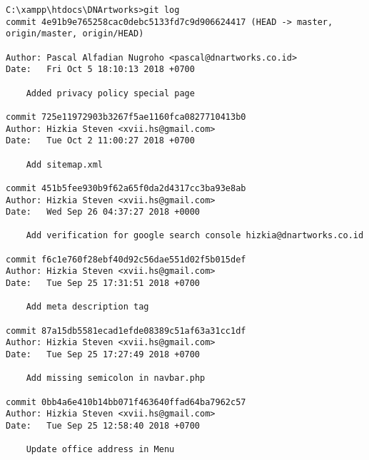 \begin{lstlisting}[caption={Histori \textit{commit} pada proyek DNArtworks},label={lst:commit_history_dnartworks},language=plaintext]
C:\xampp\htdocs\DNArtworks>git log
commit 4e91b9e765258cac0debc5133fd7c9d906624417 (HEAD -> master, origin/master, origin/HEAD)

Author: Pascal Alfadian Nugroho <pascal@dnartworks.co.id>
Date:   Fri Oct 5 18:10:13 2018 +0700

    Added privacy policy special page

commit 725e11972903b3267f5ae1160fca0827710413b0
Author: Hizkia Steven <xvii.hs@gmail.com>
Date:   Tue Oct 2 11:00:27 2018 +0700

    Add sitemap.xml

commit 451b5fee930b9f62a65f0da2d4317cc3ba93e8ab
Author: Hizkia Steven <xvii.hs@gmail.com>
Date:   Wed Sep 26 04:37:27 2018 +0000

    Add verification for google search console hizkia@dnartworks.co.id

commit f6c1e760f28ebf40d92c56dae551d02f5b015def
Author: Hizkia Steven <xvii.hs@gmail.com>
Date:   Tue Sep 25 17:31:51 2018 +0700

    Add meta description tag

commit 87a15db5581ecad1efde08389c51af63a31cc1df
Author: Hizkia Steven <xvii.hs@gmail.com>
Date:   Tue Sep 25 17:27:49 2018 +0700

    Add missing semicolon in navbar.php

commit 0bb4a6e410b14bb071f463640ffad64ba7962c57
Author: Hizkia Steven <xvii.hs@gmail.com>
Date:   Tue Sep 25 12:58:40 2018 +0700

    Update office address in Menu
    
\end{lstlisting}




